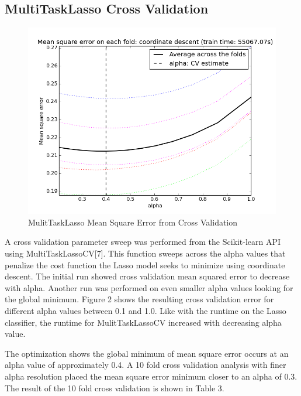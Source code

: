 \documentclass{article} %
\begin{document}
\subsection{MultiTaskLasso Cross Validation}

\begin{figure}
	\vspace{-20pt}
	\begin{center}
		\includegraphics[scale=.35]{media/cross_validation_figure_2.png}
	\end{center}
	\caption{MulitTaskLasso Mean Square Error from Cross Validation}
	\vspace{-20pt}
\end{figure}

A cross validation parameter sweep was performed from the Scikit-learn API using MultiTaskLassoCV[7]. This function sweeps across the alpha values that penalize the cost function the Lasso model seeks to minimize using coordinate descent. The initial run showed cross validation mean squared error to decrease with alpha. Another run was performed on even smaller alpha values looking for the global minimum. Figure 2 shows the resulting cross validation error for different alpha values between 0.1 and 1.0. Like with the runtime on the Lasso classifier, the runtime for MulitTaskLassoCV increased with decreasing alpha value.

The optimization shows the global minimum of mean square error occurs at an alpha value of approximately 0.4. A 10 fold cross validation analysis with finer alpha resolution placed the mean square error minimum closer to an alpha of 0.3. The result of the 10 fold cross validation is shown in Table 3.
\end{document}
